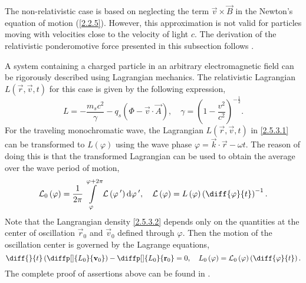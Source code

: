 The non-relativistic case is based on neglecting the term $ \vec{v} \times \vec{B} $ in the Newton's equation of motion (\ref{2.2.5}). However, this approximation is not valid for particles moving with velocities close to the velocity of light $ c $. The derivation of the relativistic ponderomotive force presented in this subsection follows \cite{Bauer1995, Mulser2010}.

A system containing a charged particle in an arbitrary electromagnetic field can be rigorously described using Lagrangian mechanics. The relativistic Lagrangian $ L \left( \vec{r}, \vec{v}, t \right)  $ for this case is given by the following expression,
\begin{equation}
\label{2.5.3.1}
L = -\frac{m_s c^2}{\gamma} - q_s \left(\Phi - \vec{v} \cdot \vec{A} \right), \quad \gamma = \left( 1 - \frac{v^{2}}{c^{2}} \right)^{-\frac{1}{2}}.
\end{equation}
For the traveling monochromatic wave, the Lagrangian $ L \left( \vec{r}, \vec{v}, t \right)  $ in \ref{2.5.3.1} can be transformed to $ L \left( \varphi \right)  $ using the wave phase $ \varphi = \vec{k} \cdot \vec{r} - \omega t $. The reason of doing this is that the transformed Lagrangian can be used to obtain the average over the wave period of motion,
\begin{equation}
\label{2.5.3.2}
\mathcal{L}_0 \left( \varphi \right) = \frac{1}{2 \pi} \int \limits_{\varphi}^{\varphi + 2\pi} \mathcal{L} \left( \varphi^{\: \prime} \right) \mathrm{d} \varphi^{\: \prime}, \quad \mathcal{L} \left( \varphi \right) = L \left( \varphi \right) \left( \diff{\varphi}{t} \right)^{-1}.
\end{equation}
Note that the Langrangian density \ref{2.5.3.2} depends only on the quantities at the center of oscillation $ \vec{r}_0 $ and $ \vec{v}_0 $ defined through $ \varphi $. Then the motion of the oscillation center is governed by the Lagrange equations,
\begin{equation}
\label{2.5.3.3}
\diff{}{t} \left( \diffp[]{L_0}{\vec{v}_0} \right) -  \diffp[]{L_0}{\vec{r}_0} = 0, \quad L_0 \left( \varphi \right) = \mathcal{L}_0 \left( \varphi \right) \left( \diff{\varphi}{t} \right).
\end{equation}
The complete proof of assertions above can be found in \cite{Bauer1995}.


